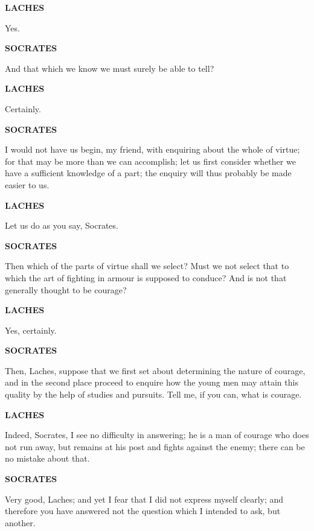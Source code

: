 \documentclass[11pt,letter]{article}
\begin{document}
\par \textbf{LACHES}
\par   Yes.

\par \textbf{SOCRATES}
\par   And that which we know we must surely be able to tell?

\par \textbf{LACHES}
\par   Certainly.

\par \textbf{SOCRATES}
\par   I would not have us begin, my friend, with enquiring about the whole of virtue; for that may be more than we can accomplish; let us first consider whether we have a sufficient knowledge of a part; the enquiry will thus probably be made easier to us.

\par \textbf{LACHES}
\par   Let us do as you say, Socrates.

\par \textbf{SOCRATES}
\par   Then which of the parts of virtue shall we select? Must we not select that to which the art of fighting in armour is supposed to conduce? And is not that generally thought to be courage?

\par \textbf{LACHES}
\par   Yes, certainly.

\par \textbf{SOCRATES}
\par   Then, Laches, suppose that we first set about determining the nature of courage, and in the second place proceed to enquire how the young men may attain this quality by the help of studies and pursuits. Tell me, if you can, what is courage.

\par \textbf{LACHES}
\par   Indeed, Socrates, I see no difficulty in answering; he is a man of courage who does not run away, but remains at his post and fights against the enemy; there can be no mistake about that.

\par \textbf{SOCRATES}
\par   Very good, Laches; and yet I fear that I did not express myself clearly; and therefore you have answered not the question which I intended to ask, but another.
\end{document}
